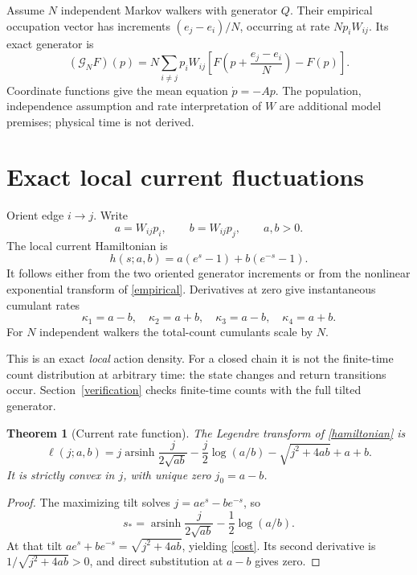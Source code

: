 \documentclass[11pt,a4paper]{article}
\newtheorem{theorem}{Theorem}
\newcommand{\arsinh}{\operatorname{arsinh}}
\begin{document}
Assume \(N\) independent Markov walkers with generator \(Q\). Their empirical
occupation vector has increments \((e_j-e_i)/N\), occurring at rate
\(Np_iW_{ij}\). Its exact generator is
\begin{equation}
(\mathcal G_NF)(p)=N\sum_{i\ne j}p_iW_{ij}
\left[F\!\left(p+\frac{e_j-e_i}{N}\right)-F(p)\right]. \label{empirical}
\end{equation}
Coordinate functions give the mean equation \(\dot p=-Ap\).
The population, independence assumption and rate interpretation of \(W\)
are additional model premises; physical time is not derived.

\section{Exact local current fluctuations}

Orient edge \(i\to j\). Write
\[
a=W_{ij}p_i,\qquad b=W_{ij}p_j,\qquad a,b>0.
\]
The local current Hamiltonian is
\begin{equation}
h(s;a,b)=a(e^s-1)+b(e^{-s}-1). \label{hamiltonian}
\end{equation}
It follows either from the two oriented generator increments or from the
nonlinear exponential transform of \eqref{empirical}. Derivatives at zero
give instantaneous cumulant rates
\[
\kappa_1=a-b,\quad\kappa_2=a+b,\quad
\kappa_3=a-b,\quad\kappa_4=a+b.
\]
For \(N\) independent walkers the total-count cumulants scale by \(N\).

This is an exact \emph{local} action density. For a closed chain it is not
the finite-time count distribution at arbitrary time: the state changes
and return transitions occur. Section~\ref{verification} checks finite-time
counts with the full tilted generator.

\begin{theorem}[Current rate function]
The Legendre transform of \eqref{hamiltonian} is
\begin{equation}
\ell(j;a,b)=j\arsinh\frac{j}{2\sqrt{ab}}
-\frac j2\log(a/b)-\sqrt{j^2+4ab}+a+b. \label{cost}
\end{equation}
It is strictly convex in \(j\), with unique zero \(j_0=a-b\).
\end{theorem}
\begin{proof}
The maximizing tilt solves \(j=ae^s-be^{-s}\), so
\[
s_*=\arsinh\frac{j}{2\sqrt{ab}}-\frac12\log(a/b).
\]
At that tilt \(ae^s+be^{-s}=\sqrt{j^2+4ab}\), yielding \eqref{cost}.
Its second derivative is \(1/\sqrt{j^2+4ab}>0\), and direct substitution
at \(a-b\) gives zero.
\end{proof}
\end{document}
